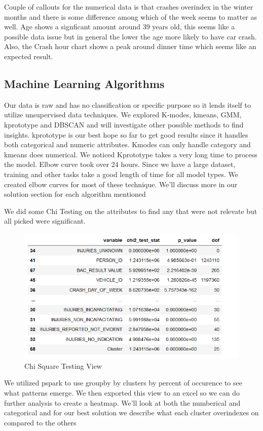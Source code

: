 \documentclass[conference]{IEEEtran}
\begin{document}
 Couple of callouts for the numerical data is that crashes overindex in the winter months and there is some difference among which of the week seems to matter as well.  Age shows a signficant amount around 39 years old, this seems like a possible data issue but in general the lower the age more likely to have car crash.  Also, the Crash hour chart shows a peak around dinner time which seems like an expected result.

\subsection{Machine Learning Algorithms}
Our data is raw and has no classification or specific purpose so it lends itself to utilize unsupervised data techniques. 
We explored K-modes, kmeans, GMM, kprototype and DBSCAN and will investigate other possible methods to find insights. kprototype is our best hope so far to get good results since it handles both categorical and numeric attributes.  Kmodes can only handle category and kmeans does numerical. We noticed Kprototype takes a very long time to process the model.  Elbow curve took over 24 hours. Since we have a large dataset, training and other tasks take a good length of time for all model types.  We created elbow curves for most of these technique. We'll discuss more in our solution section for each algorithm mentioned

We did some Chi Testing on the attributes to find any that were not relevate but all picked were significant.
\begin{figure}[!h]
	\includegraphics[width=\linewidth]{Chi Square.png}
	\caption{Chi Square Testing View}
	\label{table: Chi Square Testing View}
\end{figure}
We utilized pspark to use groupby by clusters by percent of occurence to see what patterns emerge.  We then exported this view to an excel so we can do further analysis to create a heatmap. We'll look at both the numberical and categorical and for our best solution we describe what each cluster overindexes on compared to the others
\end{document}

